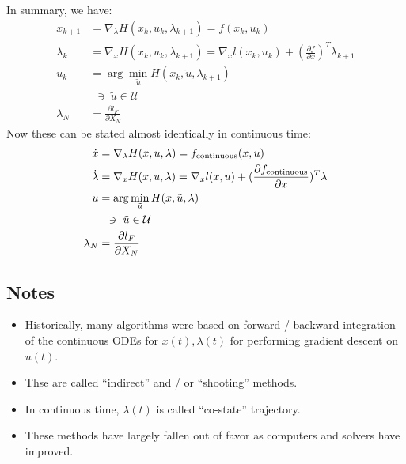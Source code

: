 \noindent
In summary, we have: 
\begin{align}
    x_{k+1} &= \nabla_{\lambda} H(x_k, u_k, \lambda_{k+1}) = f(x_k, u_k) \\
    \lambda_k &= \nabla_{x} H(x_k,u_k,\lambda_{k+1}) = \nabla_x l(x_k,u_k) + (\frac{\partial f}{\partial x})^T \lambda_{k+1} \\
    u_k &= \arg\min_{\tilde{u}} H(x_k, \tilde{u}, \lambda_{k+1}) \\
    &\ \ \ni \ \tilde{u} \in \mathcal{U} \\
    \lambda_{N} &= \frac{\partial l_F}{\partial X_{N}}
\end{align}
Now these can be stated almost identically in continuous time: 
\begin{align}
    \dot{x} &= \nabla_{\lambda} H(x, u, \lambda) = f_{\rm continuous}(x, u) \\
    \dot{\lambda} &= \nabla_{x} H(x,u,\lambda) = \nabla_x l(x,u) + (\frac{\partial f_{\rm continuous}}{\partial x})^T \lambda \\
    u &= \arg\min_{\tilde{u}} H(x, \tilde{u}, \lambda) \\
    &\ \ \ni \  \tilde{u} \in \mathcal{U} \\
    \lambda_{N} &= \frac{\partial l_F}{\partial X_{N}}
\end{align}

\subsection{Notes}
\begin{itemize}
    \item Historically, many algorithms were based on forward / backward integration of the continuous ODEs for $x(t), \lambda(t)$ for performing gradient descent on $u(t)$. 
    \item Thse are called ``indirect'' and / or ``shooting'' methods. 
    \item In continuous time, $\lambda(t)$ is called ``co-state'' trajectory. 
    \item These methods have largely fallen out of favor as computers and solvers have improved. 
\end{itemize}

